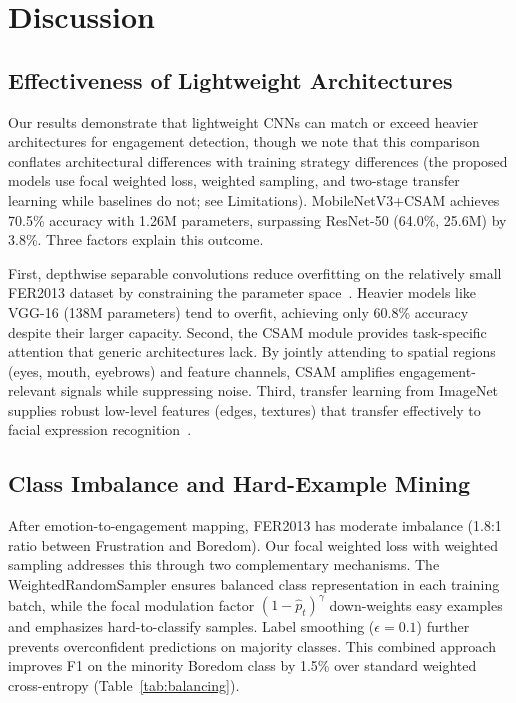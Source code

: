 \documentclass[apajournal,article,submit,pdftex,moreauthors]{Definitions/mdpi}
\begin{document}
\section{Discussion}
\label{sec:discussion}

\subsection{Effectiveness of Lightweight Architectures}

Our results demonstrate that lightweight CNNs can match or exceed heavier architectures for engagement detection, though we note that this comparison conflates architectural differences with training strategy differences (the proposed models use focal weighted loss, weighted sampling, and two-stage transfer learning while baselines do not; see Limitations). MobileNetV3+CSAM achieves 70.5\% accuracy with 1.26M parameters, surpassing ResNet-50 (64.0\%, 25.6M) by 3.8\%. Three factors explain this outcome.

First, depthwise separable convolutions reduce overfitting on the relatively small FER2013 dataset by constraining the parameter space~\citep{howard2017mobilenets}. Heavier models like VGG-16 (138M parameters) tend to overfit, achieving only 60.8\% accuracy despite their larger capacity. Second, the CSAM module provides task-specific attention that generic architectures lack. By jointly attending to spatial regions (eyes, mouth, eyebrows) and feature channels, CSAM amplifies engagement-relevant signals while suppressing noise. Third, transfer learning from ImageNet supplies robust low-level features (edges, textures) that transfer effectively to facial expression recognition~\citep{li2021facial}.

\subsection{Class Imbalance and Hard-Example Mining}

After emotion-to-engagement mapping, FER2013 has moderate imbalance (1.8:1 ratio between Frustration and Boredom). Our focal weighted loss with weighted sampling addresses this through two complementary mechanisms. The WeightedRandomSampler ensures balanced class representation in each training batch, while the focal modulation factor $(1-\hat{p}_t)^\gamma$ down-weights easy examples and emphasizes hard-to-classify samples. Label smoothing ($\epsilon=0.1$) further prevents overconfident predictions on majority classes. This combined approach improves F1 on the minority Boredom class by 1.5\% over standard weighted cross-entropy (Table~\ref{tab:balancing}).
\end{document}
